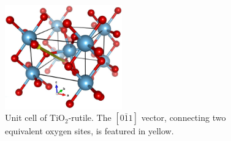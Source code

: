 \begin{center}
 \begin{figure}[ht!]
  \begin{center}
   \includegraphics[width=0.45\textwidth]{img/TiO2-rutile-vector.jpg}
   \caption{Unit cell of TiO$_2$-rutile. The $[0\bar{1}1]$ vector, connecting two equivalent oxygen sites, is featured in yellow.}
   \label{fig:rutile-vector} 
  \end{center}
 \end{figure}
\end{center}

